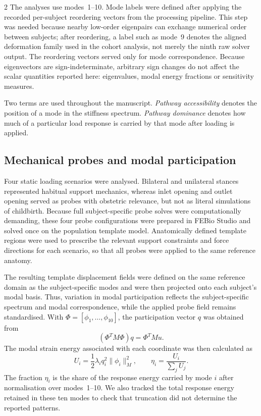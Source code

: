 \documentclass[openacc]{rsproca_new}
\begin{document}
\begin{multicols}{2}
The analyses use modes~1--10. Mode labels were defined after applying the recorded per-subject reordering vectors from the processing pipeline. This step was needed because nearby low-order eigenpairs can exchange numerical order between subjects; after reordering, a label such as mode~9 denotes the aligned deformation family used in the cohort analysis, not merely the ninth raw solver output. The reordering vectors served only for mode correspondence. Because eigenvectors are sign-indeterminate, arbitrary sign changes do not affect the scalar quantities reported here: eigenvalues, modal energy fractions or sensitivity measures.

Two terms are used throughout the manuscript. \emph{Pathway accessibility} denotes the position of a mode in the stiffness spectrum. \emph{Pathway dominance} denotes how much of a particular load response is carried by that mode after loading is applied.


\subsection{Mechanical probes and modal participation}

Four static loading scenarios were analysed. Bilateral and unilateral stances represented habitual support mechanics, whereas inlet opening and outlet opening served as probes with obstetric relevance, but not as literal simulations of childbirth. Because full subject-specific probe solves were computationally demanding, these four probe configurations were prepared in FEBio Studio \cite{Maas2017FEBioHistory} and solved once on the population template model.  Anatomically defined template regions were used to prescribe the relevant support constraints and force directions for each scenario, so that all probes were applied to the same reference anatomy.

The resulting template displacement fields were defined on the same reference domain as the subject-specific modes and were then projected onto each subject's modal basis. Thus, variation in modal participation reflects the subject-specific spectrum and modal correspondence, while the applied probe field remains standardised. With $\Phi=[\phi_{1},\ldots,\phi_{10}]$, the participation vector $q$ was obtained from
\begin{equation}
(\Phi^{T}M\Phi)q = \Phi^{T}Mu.
\end{equation}
The modal strain energy associated with each coordinate was then calculated as
\begin{equation}
U_{i}=\frac{1}{2}\lambda_{i}q_{i}^{2}\lVert\phi_{i}\rVert_{M}^{2}, \qquad
\eta_{i}=\frac{U_{i}}{\sum_{j}U_{j}}.
\end{equation}
The fraction $\eta_i$ is the share of the response energy carried by mode $i$ after normalisation over modes~1--10. We also tracked the total response energy retained in these ten modes to check that truncation did not determine the reported patterns.


\end{multicols}
\end{document}
